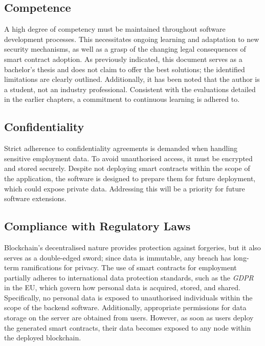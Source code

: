 \subsection{Competence}

A high degree of competency must be maintained throughout software development processes. This necessitates ongoing learning and adaptation to new security mechanisms, as well as a grasp of the changing legal consequences of smart contract adoption. As previously indicated, this document serves as a bachelor's thesis and does not claim to offer the best solutions; the identified limitations are clearly outlined. Additionally, it has been noted that the author is a student, not an industry professional. Consistent with the evaluations detailed in the earlier chapters, a commitment to continuous learning is adhered to.

\subsection{Confidentiality}

Strict adherence to confidentiality agreements is demanded when handling sensitive employment data. To avoid unauthorised access, it must be encrypted and stored securely. Despite not deploying smart contracts within the scope of the application, the software is designed to prepare them for future deployment, which could expose private data. Addressing this will be a priority for future software extensions.

\subsection{Compliance with Regulatory Laws}

Blockchain's decentralised nature provides protection against forgeries, but it also serves as a double-edged sword; since data is immutable, any breach has long-term ramifications for privacy. The use of smart contracts for employment partially adheres to international data protection standards, such as the \textit{GDPR} in the EU, which govern how personal data is acquired, stored, and shared. Specifically, no personal data is exposed to unauthorised individuals within the scope of the backend software. Additionally, appropriate permissions for data storage on the server are obtained from users. However, as soon as users deploy the generated smart contracts, their data becomes exposed to any node within the deployed blockchain. 
    
